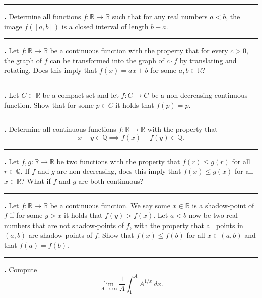 \documentclass[11pt]{article}
\newcounter{probnum}
\newenvironment{problembox}{\par\noindent\rule{\linewidth}{0.5pt}\vspace{5pt}\par}{\vspace{2pt}}
\begin{document}
\begin{problembox}
\textbf{\theprobnum.} Determine all functions $f : \mathbb{R} \to \mathbb{R}$ such that for any real numbers $a < b$, the image $f([a,b])$ is a closed interval of length $b - a$.
\end{problembox}

\begin{problembox}
\textbf{\theprobnum.} Let $f : \mathbb{R} \to \mathbb{R}$ be a continuous function with the property that for every $c > 0$, the graph of $f$ can be transformed into the graph of $c \cdot f$ by translating and rotating. Does this imply that $f(x) = ax + b$ for some $a, b \in \mathbb{R}$?
\end{problembox}

\begin{problembox}
\textbf{\theprobnum.} Let $C \subset \mathbb{R}$ be a compact set and let $f : C \to C$ be a non-decreasing continuous function. Show that for some $p \in C$ it holds that $f(p) = p$.
\end{problembox}

\begin{problembox}
\textbf{\theprobnum.} Determine all continuous functions $f : \mathbb{R} \to \mathbb{R}$ with the property that
\[
x - y \in \mathbb{Q} \implies f(x) - f(y) \in \mathbb{Q}.
\]
\end{problembox}

\begin{problembox}
\textbf{\theprobnum.} Let $f, g : \mathbb{R} \to \mathbb{R}$ be two functions with the property that $f(r) \le g(r)$ for all $r \in \mathbb{Q}$. If $f$ and $g$ are non-decreasing, does this imply that $f(x) \le g(x)$ for all $x \in \mathbb{R}$? What if $f$ and $g$ are both continuous?
\end{problembox}

\begin{problembox}
\textbf{\theprobnum.} Let $f : \mathbb{R} \to \mathbb{R}$ be a continuous function. We say some $x \in \mathbb{R}$ is a shadow-point of $f$ if for some $y > x$ it holds that $f(y) > f(x)$. Let $a < b$ now be two real numbers that are not shadow-points of $f$, with the property that all points in $(a,b)$ are shadow-points of $f$. Show that $f(x) \le f(b)$ for all $x \in (a,b)$ and that $f(a) = f(b)$.
\end{problembox}

\begin{problembox}
\textbf{\theprobnum.} Compute
\[
\lim_{A \to \infty} \frac{1}{A} \int_1^A A^{1/x}\,dx.
\]
\end{problembox}
\end{document}
